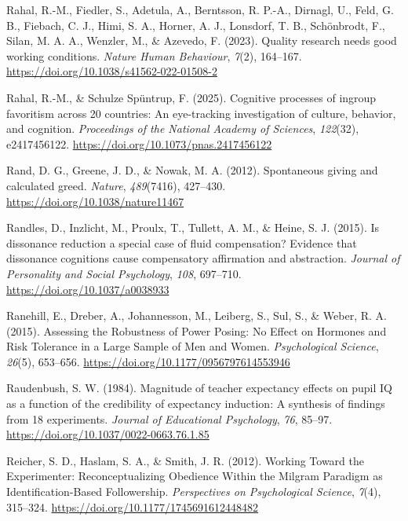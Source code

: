 \documentclass[
  letterpaper,
]{book}
\newlength{\cslhangindent}
\newenvironment{CSLReferences}[2] %
 {\begin{list}{}{%
  \setlength{\itemindent}{0pt}
  \setlength{\leftmargin}{0pt}
  \setlength{\parsep}{0pt}
  \ifodd #1
   \setlength{\leftmargin}{\cslhangindent}
   \setlength{\itemindent}{-1\cslhangindent}
  \fi
  \setlength{\itemsep}{#2\baselineskip}}}
 {\end{list}}
\begin{document}
\begin{CSLReferences}{1}{0}
Rahal, R.-M., Fiedler, S., Adetula, A., Berntsson, R. P.-A., Dirnagl,
U., Feld, G. B., Fiebach, C. J., Himi, S. A., Horner, A. J., Lonsdorf,
T. B., Schönbrodt, F., Silan, M. A. A., Wenzler, M., \& Azevedo, F.
(2023). Quality research needs good working conditions. \emph{Nature
Human Behaviour}, \emph{7}(2), 164--167.
\url{https://doi.org/10.1038/s41562-022-01508-2}

Rahal, R.-M., \& Schulze Spüntrup, F. (2025). Cognitive processes of
ingroup favoritism across 20 countries: {An} eye-tracking investigation
of culture, behavior, and cognition. \emph{Proceedings of the National
Academy of Sciences}, \emph{122}(32), e2417456122.
\url{https://doi.org/10.1073/pnas.2417456122}

Rand, D. G., Greene, J. D., \& Nowak, M. A. (2012). Spontaneous giving
and calculated greed. \emph{Nature}, \emph{489}(7416), 427--430.
\url{https://doi.org/10.1038/nature11467}

Randles, D., Inzlicht, M., Proulx, T., Tullett, A. M., \& Heine, S. J.
(2015). {Is dissonance reduction a special case of fluid compensation?
Evidence that dissonance cognitions cause compensatory affirmation and
abstraction}. \emph{{Journal of Personality and Social Psychology}},
\emph{108}, 697--710. \url{https://doi.org/10.1037/a0038933}

Ranehill, E., Dreber, A., Johannesson, M., Leiberg, S., Sul, S., \&
Weber, R. A. (2015). Assessing the {Robustness} of {Power} {Posing}:
{No} {Effect} on {Hormones} and {Risk} {Tolerance} in a {Large} {Sample}
of {Men} and {Women}. \emph{Psychological Science}, \emph{26}(5),
653--656. \url{https://doi.org/10.1177/0956797614553946}

Raudenbush, S. W. (1984). Magnitude of teacher expectancy effects on
pupil IQ as a function of the credibility of expectancy induction: A
synthesis of findings from 18 experiments. \emph{Journal of Educational
Psychology}, \emph{76}, 85--97.
\url{https://doi.org/10.1037/0022-0663.76.1.85}

Reicher, S. D., Haslam, S. A., \& Smith, J. R. (2012). Working {Toward}
the {Experimenter}: {Reconceptualizing} {Obedience} {Within} the
{Milgram} {Paradigm} as {Identification}-{Based} {Followership}.
\emph{Perspectives on Psychological Science}, \emph{7}(4), 315--324.
\url{https://doi.org/10.1177/1745691612448482}


\end{CSLReferences}
\end{document}
